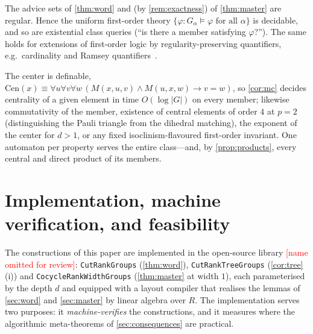\documentclass[a4paper,UKenglish,autoref,anonymous]{lipics-v2021}
\newcommand{\R}{R}                                   %
\newcommand{\adv}{\alpha}
\newcommand{\AutStr}{\textcolor{red}{[name omitted for review]}}
\newcommand{\AutStrCite}{}
\newcommand{\AutStr}{\textsf{AutStr}}
\newcommand{\AutStrCite}{~\cite{AutStr}}
\begin{document}
\begin{corollary}
\label{cor:theory}
The advice sets of \autoref{thm:word} and (by \autoref{rem:exactness})
of \autoref{thm:master} are regular. Hence the uniform first-order
theory $\{\varphi : G_\adv \models \varphi \text{ for all } \adv\}$ is
decidable, and so are existential class queries (``is there a member
satisfying $\varphi$?''). The same holds for extensions of first-order
logic by regularity-preserving quantifiers, e.g.\ cardinality and
Ramsey quantifiers~\cite{AbuZaidGraedelReinhardt2017}.
\end{corollary}

\begin{example}
The center is definable, $\mathrm{Cen}(x) \equiv \forall u \forall v
\forall w\, (M(x,u,v) \wedge M(u,x,w) \to v = w)$, so \autoref{cor:mc}
decides centrality of a given element in time $O(\log|G|)$ on every
member; likewise commutativity of the member, existence of central
elements of order $4$ at $p = 2$ (distinguishing the Pauli triangle
from the dihedral matching), the exponent of the center for $d > 1$, or
any fixed isoclinism-flavoured first-order invariant. One automaton per
property serves the entire class---and, by \autoref{prop:products},
every central and direct product of its members.
\end{example}

\section{Implementation, machine verification, and feasibility}
\label{sec:implementation}

The constructions of this paper are implemented in the open-source
library \AutStr\AutStrCite{}: \texttt{CutRankGroups}
(\autoref{thm:word}), \texttt{CutRankTreeGroups}
(\autoref{cor:tree}(i)) and \texttt{CocycleRankWidthGroups}
(\autoref{thm:master} at width $1$), each parameterised by the depth
$d$ and equipped with a layout compiler that realises the lemmas of
\autoref{sec:word} and \autoref{sec:master} by linear algebra over
$\R$. The implementation serves two purposes: it \emph{machine-verifies}
the constructions, and it measures where the algorithmic meta-theorems
of \autoref{sec:consequences} are practical.
\end{document}
